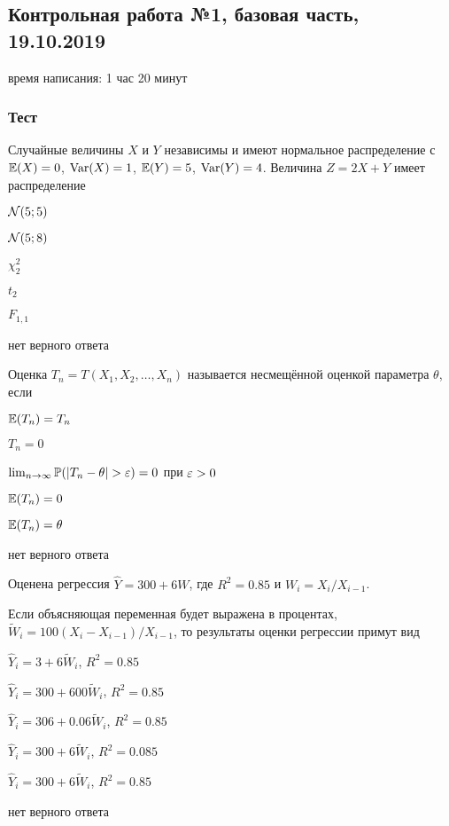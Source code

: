 \subsection{Контрольная работа №1, базовая часть, 19.10.2019}

время написания: 1 час 20 минут

\subsubsection*{Тест}


\begin{question}
Случайные величины $X$ и $Y$ независимы и имеют нормальное распределение с $\operatorname{\mathbb{E}}(X) = 0$, $\operatorname{Var}(X)=1$, $\operatorname{\mathbb{E}}(Y)=5$, $\operatorname{Var}(Y) = 4$. 
Величина $Z = 2X + Y$ имеет распределение
\begin{answerlist}
  \item $\mathcal{N}(5;5)$
  \item $\mathcal{N}(5;8)$
  \item $\chi^2_2$
  \item $t_2$
  \item $F_{1,1}$
  \item нет верного ответа
\end{answerlist}
\end{question}


\begin{question}
Оценка $T_n = T(X_1, X_2, \ldots, X_n)$ называется несмещённой оценкой параметра $\theta$, если
\begin{answerlist}[2]
  \item $\operatorname{\mathbb{E}}(T_n) = T_n$
  \item $T_n = 0$
  \item $\lim_{n\to\infty} \P(|T_n - \theta|>\e) = 0$ при $\varepsilon>0$
  \item $\operatorname{\mathbb{E}}(T_n) = 0$
  \item $\operatorname{\mathbb{E}}(T_n) = \theta$
  \item нет верного ответа
\end{answerlist}
\end{question}



\begin{question}
Оценена регрессия $\hat Y = 300 + 6W$, где $R^2 = 0.85$ и $W_i = X_i / X_{i-1}$.

Если объясняющая переменная будет выражена в процентах, $\tilde W_i = 100(X_i - X_{i-1})/X_{i-1}$, то результаты оценки регрессии примут вид
\begin{answerlist}
  \item $\hat Y_i = 3 + 6 \tilde W_i$, $R^2= 0.85$
  \item $\hat Y_i = 300 + 600 \tilde W_i$, $R^2= 0.85$
  \item $\hat Y_i = 306 + 0.06 \tilde W_i$, $R^2= 0.85$
  \item $\hat Y_i = 300 + 6 \tilde W_i$, $R^2= 0.085$
  \item $\hat Y_i = 300 + 6 \tilde W_i$, $R^2= 0.85$
  \item нет верного ответа
\end{answerlist}
\end{question}



